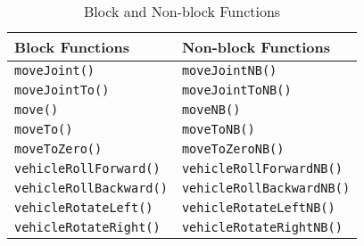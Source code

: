 \begin{center}
    \begin{longtable}{ p{7cm}p{7cm}}
\caption{Block and Non-block Functions\label{tab:block_nonblock}}\\
\hline
Block Functions & Non-block Functions\\
\hline
\texttt{moveJoint()}            &\texttt{moveJointNB()}\\
\texttt{moveJointTo()}          &\texttt{moveJointToNB()}\\
\texttt{move()}                 &\texttt{moveNB()}\\
\texttt{moveTo()}               &\texttt{moveToNB()}\\
\texttt{moveToZero()}           &\texttt{moveToZeroNB()}\\
\texttt{vehicleRollForward()}      &\texttt{vehicleRollForwardNB()}\\
\texttt{vehicleRollBackward()}     &\texttt{vehicleRollBackwardNB()}\\
\texttt{vehicleRotateLeft()}       &\texttt{vehicleRotateLeftNB()}\\
\texttt{vehicleRotateRight()}      &\texttt{vehicleRotateRightNB()}\\
\hline
\end{longtable}
\end{center}
